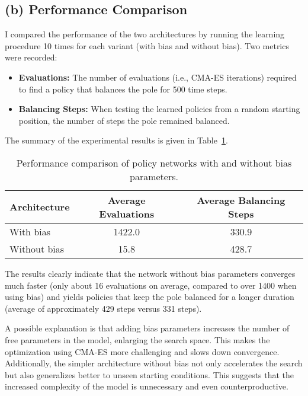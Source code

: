 \subsection*{(b) Performance Comparison}
I compared the performance of the two architectures by running the learning procedure 10 times for each variant (with bias and without bias). Two metrics were recorded:
\begin{itemize}
    \item \textbf{Evaluations:} The number of evaluations (i.e., CMA-ES iterations) required to find a policy that balances the pole for 500 time steps.
    \item \textbf{Balancing Steps:} When testing the learned policies from a random starting position, the number of steps the pole remained balanced.
\end{itemize}

The summary of the experimental results is given in Table~\ref{tab:results}.

\begin{table}[ht]
\centering
\begin{tabular}{lcc}
\toprule
Architecture & Average Evaluations & Average Balancing Steps\\
\midrule
With bias    & 1422.0              & 330.9 \\
Without bias & 15.8                & 428.7 \\
\bottomrule
\end{tabular}
\caption{Performance comparison of policy networks with and without bias parameters.}
\label{tab:results}
\end{table}

\medskip

The results clearly indicate that the network without bias parameters converges much faster (only about 16 evaluations on average,
compared to over 1400 when using bias) and yields policies that keep the pole balanced for a longer duration (average of approximately
429 steps versus 331 steps).

A possible explanation is that adding bias parameters increases the number of free parameters in the model,
enlarging the search space. This makes the optimization using CMA-ES more challenging and slows down convergence.
Additionally, the simpler architecture without bias not only accelerates the search but also generalizes better to unseen starting conditions. This suggests that the increased complexity of the model is unnecessary and even counterproductive.